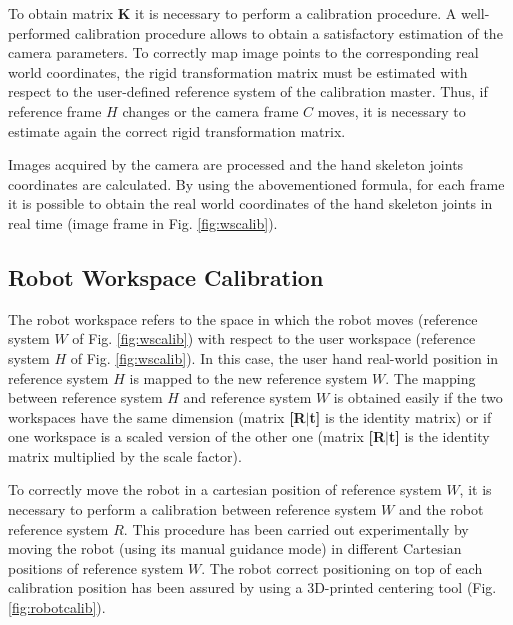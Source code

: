 \documentclass[letterpaper, 10 pt, conference]{ieeeconf}  %
\begin{document}
To obtain matrix \textbf{K} it is necessary to perform a calibration procedure. A well-performed calibration procedure allows to obtain a satisfactory estimation of the camera parameters. To correctly map image points to the corresponding real world coordinates, the rigid transformation matrix must be estimated with respect to the user-defined reference system of the calibration master. Thus, if reference frame $H$ changes or the camera frame $C$ moves, it is necessary to estimate again the correct rigid transformation matrix. %


Images acquired by the camera are processed and the hand skeleton joints coordinates are calculated. By using the abovementioned formula, for each frame it is possible to obtain the real world coordinates of the hand skeleton joints in real time (image frame in Fig. \ref{fig:wscalib}).


\subsection{Robot Workspace Calibration}
The robot workspace refers to the space in which the robot moves (reference system $W$ of Fig. \ref{fig:wscalib}) with respect to the user workspace (reference system $H$ of Fig. \ref{fig:wscalib}). In this case, the user hand real-world position in reference system $H$ is mapped to the new reference system $W$. The mapping between reference system $H$ and reference system $W$ is obtained easily if the two workspaces have the same dimension (matrix \textbf{[R$|$t]} is the identity matrix) or if one workspace is a scaled version of the other one (matrix \textbf{[R$|$t]} is the identity matrix multiplied by the scale factor). %

To correctly move the robot in a cartesian position of reference system $W$, it is necessary to perform a calibration between reference system $W$ and the robot reference system $R$. This procedure has been carried out experimentally by moving the robot (using its manual guidance mode) in different Cartesian positions of reference system $W$. The robot correct positioning on top of each calibration position has been assured by using a 3D-printed centering tool (Fig. \ref{fig:robotcalib}). 
\end{document}
